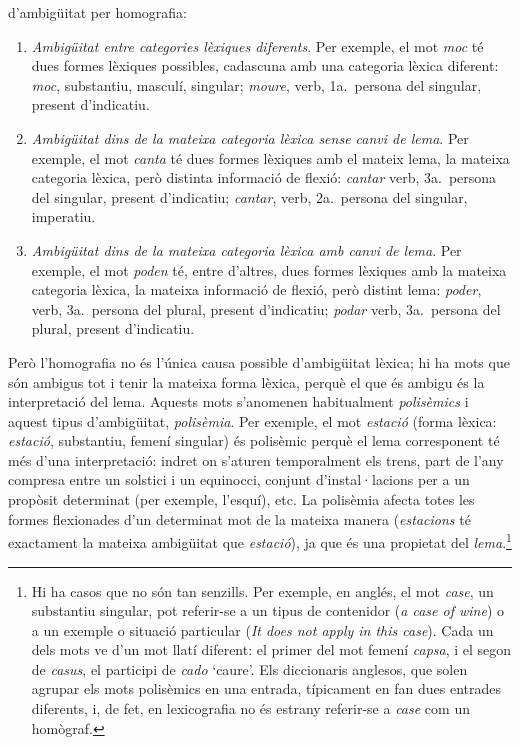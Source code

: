 d'ambigüitat per homografia:
\begin{enumerate}
\item \emph{Ambigüitat entre categories lèxiques diferents}. Per
  exemple, el mot \emph{moc} té dues formes lèxiques possibles,
  cadascuna amb una categoria lèxica diferent: \emph{moc}, substantiu,
  masculí, singular; \emph{moure}, verb, 1a.\ persona del singular,
  present d'indicatiu.
\item \emph{Ambigüitat dins de la mateixa categoria lèxica sense canvi
    de lema}. Per exemple, el mot \emph{canta} té dues formes lèxiques
  amb el mateix lema, la mateixa categoria lèxica, però distinta
  informació de flexió: \emph{cantar} verb, 3a.\ persona del
  singular, present d'indicatiu; \emph{cantar}, verb, 2a.\ persona
  del singular, imperatiu.
\item \emph{Ambigüitat dins de la mateixa categoria lèxica amb canvi
    de lema}. Per exemple, el mot \emph{poden} té, entre d'altres,
  dues formes lèxiques amb la mateixa categoria lèxica, la mateixa
  informació de flexió, però distint lema: \emph{poder}, verb, 3a.\
  persona del plural, present d'indicatiu; \emph{podar} verb, 3a.\
  persona del plural, present d'indicatiu.
\end{enumerate}

Però l'homografia no és l'única causa possible d'ambigüitat lèxica; hi
ha mots que són ambigus tot i tenir la mateixa forma lèxica, perquè el
que és ambigu és la interpretació del lema. Aquests mots s'anomenen
habitualment \emph{polisèmics} i aquest tipus d'ambigüitat,
\emph{polisèmia}. Per exemple, el mot \emph{estació} (forma lèxica:
\emph{estació}, substantiu, femení singular) és polisèmic perquè el
lema corresponent té més d'una interpretació: indret on s'aturen
temporalment els trens, part de l'any compresa entre un solstici i un
equinocci, conjunt d'instal·lacions per a un propòsit determinat (per
exemple, l'esquí), etc. La polisèmia afecta totes les formes
flexionades d'un determinat mot de la mateixa manera (\emph{estacions}
té exactament la mateixa ambigüitat que \emph{estació}), ja que és una
propietat del \emph{lema}.\footnote{Hi ha casos que no són tan
  senzills. Per exemple, en anglés, el mot \emph{case}, un substantiu
  singular, pot referir-se a un tipus de contenidor (\emph{a case of
    wine}) o a un exemple o situació particular (\emph{It does not
    apply in this case}). Cada un dels mots ve d'un mot llatí
  diferent: el primer del mot femení \emph{capsa}, i el segon de
  \emph{casus}, el participi de \emph{cado} `caure'. Els diccionaris
  anglesos, que solen agrupar els mots polisèmics en una entrada,
  típicament en fan dues entrades diferents, i, de fet, en
  lexicografia no és estrany referir-se a \emph{case} com un
  homògraf.}

